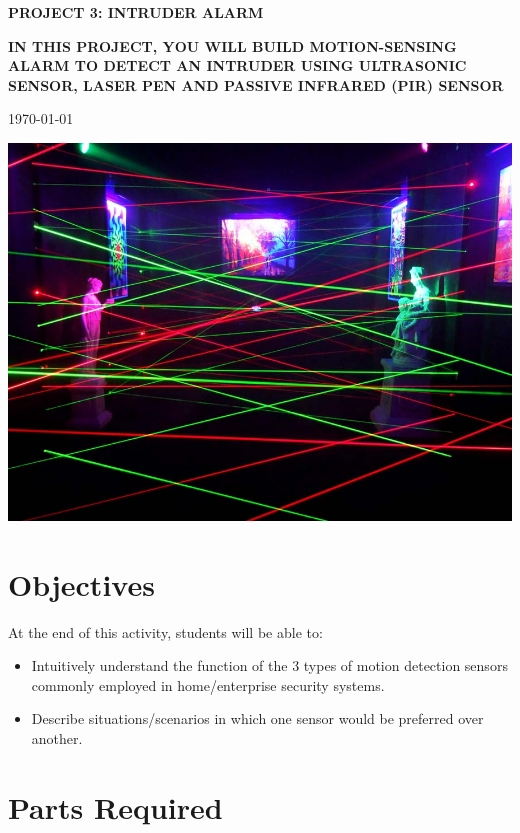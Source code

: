 \documentclass{article}
\begin{document}
    \begin{titlepage}
      \centering
        \vfill
        {\bfseries\Huge
          PROJECT 3: INTRUDER ALARM \\
            \vskip2cm
          }

          {\bfseries\Large
            IN THIS PROJECT, YOU WILL BUILD MOTION-SENSING ALARM TO DETECT AN INTRUDER USING ULTRASONIC SENSOR, LASER PEN AND PASSIVE INFRARED (PIR) SENSOR\\
          } {

            \vskip1cm
            \today\\
        }
        \vfill
        \includegraphics[width=\textwidth]{laser.jpg}
        \vfill
        \vfill
    \end{titlepage}
\newpage

\section{Objectives}\label{sec:objectives}
At the end of this activity, students will be able to:

\begin{itemize}
\item {Intuitively understand the function of the 3 types of motion detection sensors
    commonly employed in home/enterprise security systems.}
\item {Describe situations/scenarios in which one sensor would be preferred over
    another. }
\end{itemize}

\section{Parts Required}\label{sec:parts}
\end{document}
